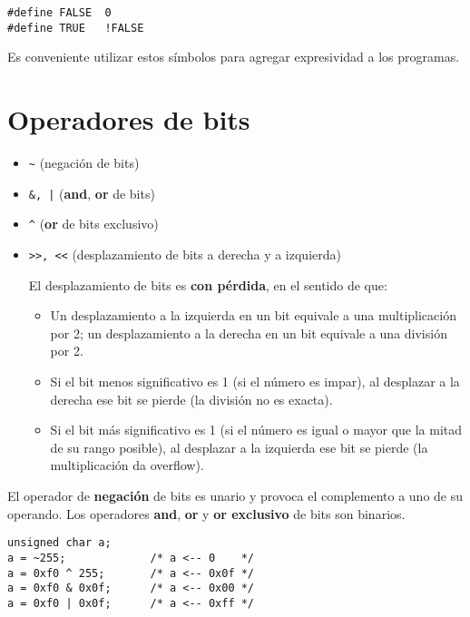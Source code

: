 \begin{lstlisting}
#define FALSE  0
#define TRUE   !FALSE   
\end{lstlisting}
    
Es conveniente utilizar estos símbolos para agregar expresividad a los programas.

\section{Operadores de bits}
\begin{itemize}
	\item \lstinline{~} (negación de bits)
	\item \lstinline{&, |} (\textbf{and}, \textbf{or} de bits)
	\item \lstinline{^} (\textbf{or} de bits exclusivo)
	\item \lstinline{>>, <<} (desplazamiento de bits a derecha y a izquierda)

El desplazamiento de bits es \textbf{con pérdida}, en el sentido de que:
\begin{itemize}
	\item Un desplazamiento a la izquierda en un bit equivale a una multiplicación por 2; un desplazamiento a la derecha en un bit equivale a una división por 2. 
	\item Si el bit menos significativo es 1 (si el número es impar), al desplazar a la derecha ese bit se pierde (la división no es exacta).
	\item Si el bit más significativo es 1 (si el número es igual o mayor que la mitad de su rango posible), al desplazar a la izquierda ese bit se pierde (la multiplicación da overflow).
\end{itemize}
\end{itemize}

\begin{ejemplo}
El operador de \textbf{negación} de bits es unario y provoca el complemento a uno de su operando. Los operadores \textbf{and}, \textbf{or} y \textbf{or exclusivo} de bits son binarios.
\begin{lstlisting}
unsigned char a;
a = ~255;             /* a <-- 0    */
a = 0xf0 ^ 255;       /* a <-- 0x0f */
a = 0xf0 & 0x0f;      /* a <-- 0x00 */
a = 0xf0 | 0x0f;      /* a <-- 0xff */                
\end{lstlisting}
\end{ejemplo}

